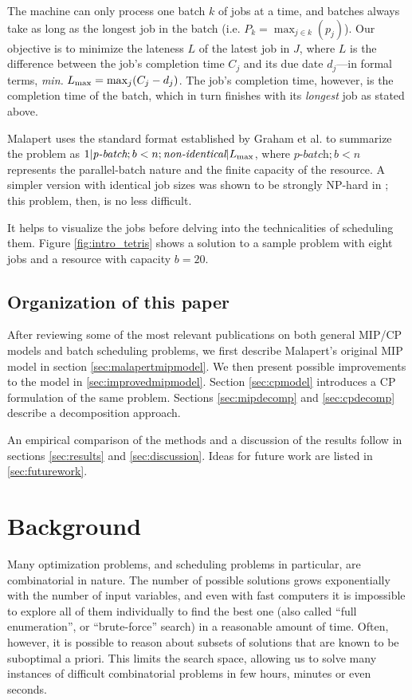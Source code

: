 \documentclass[13pt, letterpaper, oneside]{book}
\begin{document}
The machine can only process one batch $k$ of jobs at a time, and batches always
take as long as the longest job in the batch (i.e. $P_k = \max_{j \in k}(p_j)$).
Our objective is to minimize the lateness $L$ of the latest job in $J$, where
$L$ is the difference between the job's completion time $C_j$ and its due date
$d_j$---in formal terms, \textit{min.} $L_{\text{max}} = \max_j(C_j - d_j)$. The job's
completion time, however, is the completion time of the batch, which in turn
finishes with its \textit{longest} job as stated above.

Malapert uses the standard format established by Graham et al. to
summarize the problem as $1|\textit{p-batch}; b < n;
\textit{non-identical}|L_{\text{max}}$, where $\textit{p-batch};b<n$ represents the
parallel-batch nature and the finite capacity of the resource. A simpler version
with identical job sizes was shown to be strongly NP-hard in \citep{Brucker};
this problem, then, is no less difficult.

It helps to visualize the jobs before delving into the technicalities of
scheduling them. Figure \ref{fig:intro_tetris} shows a solution to a sample
problem with eight jobs and a resource with capacity $b = 20$.


\section{Organization of this paper}
After reviewing some of the most relevant publications on both general MIP/CP models and
batch scheduling problems, we first describe Malapert's original MIP model in
section \ref{sec:malapertmipmodel}. We then present possible improvements to the
model in \ref{sec:improvedmipmodel}. Section \ref{sec:cpmodel} introduces a CP formulation of the same
problem. Sections \ref{sec:mipdecomp} and \ref{sec:cpdecomp} describe a
decomposition approach.

An empirical comparison of the methods and a discussion of the results follow in
sections \ref{sec:results} and \ref{sec:discussion}. Ideas for future work are
listed in \ref{sec:futurework}.

\chapter{Background}
Many optimization problems, and scheduling problems in particular, are
combinatorial in nature. The number of possible solutions grows exponentially
with the number of input variables, and even with fast computers it is
impossible to explore all of them individually to find the best one
(also called ``full enumeration'', or ``brute-force'' search) in a reasonable
amount of time. Often, however, it is possible to reason about subsets of
solutions that are known to be suboptimal a priori. This limits the search
space, allowing us to solve many instances of difficult combinatorial problems
in few hours, minutes or even seconds.
\end{document}

